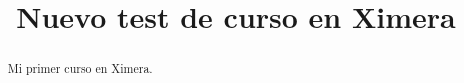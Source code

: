 \documentclass{xourse}
\title{Nuevo test de curso en Ximera}
\begin{document}
  
\begin{abstract} %
Mi primer curso en Ximera.  
\end{abstract}  
\maketitle  
 
 
\end{document}
